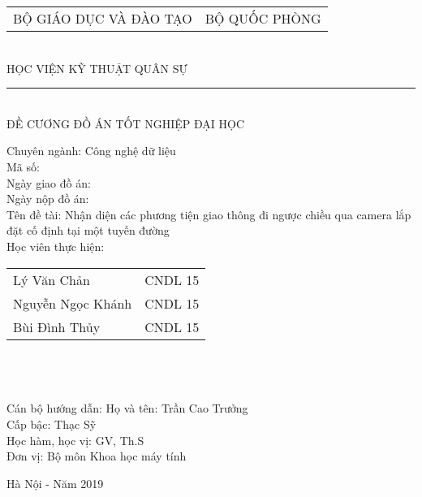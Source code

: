\begin{center}
\vfill
\begin{tabular*}{0.8\linewidth}{@{\extracolsep{\fill}}cc}
	\large BỘ GIÁO DỤC VÀ ĐÀO TẠO  & \large BỘ QUỐC PHÒNG \\
\end{tabular*}
\\
\large HỌC VIỆN KỸ THUẬT QUÂN SỰ
\\
\rule{200px}{1px}\\
ĐỀ CƯƠNG ĐỒ ÁN TỐT NGHIỆP ĐẠI HỌC \\

\end{center}
\vfill
Chuyên ngành: Công nghệ dữ liệu\\
Mã số:\\
Ngày giao đồ án:\\
Ngày nộp đồ án:\\
Tên đề tài: Nhận diện các phương tiện giao thông đi ngược chiều qua camera lắp đặt cố định tại một tuyến đường\\
Học viên thực hiện:
\smallbreak
\begin{tabularx}{\linewidth}{l l}
	 Lý Văn Chản  & CNDL 15\\
	 Nguyễn Ngọc Khánh  & CNDL 15\\
	 Bùi Đình Thủy  &  CNDL 15\\
\end{tabularx}\\\\\\
Cán bộ hướng dẫn:
Họ và tên: Trần Cao Trưởng\\
Cấp bậc: Thạc Sỹ\\
Học hàm, học vị: GV, Th.S\\
Đơn vị: Bộ môn Khoa học máy tính

\vfill
\begin{center}
Hà Nội - Năm 2019
\end{center}

